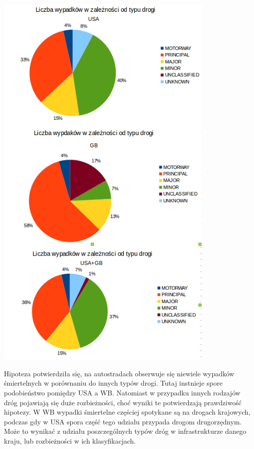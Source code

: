 \centerline{\includegraphics[width=0.8\textwidth]{images/statistics/road_type.png}}

Hipoteza potwierdziła się, na autostradach obserwuje się niewiele
wypadków śmiertelnych w porównaniu do innych typów drogi. Tutaj
instnieje spore podobieństwo pomiędzy USA a WB. Natomiast w przypadku
innych rodzajów dróg pojawiają się duże rozbieżności, choć wyniki te
potwierdzają prawdziwość hipotezy. W WB wypadki śmiertelne częściej
spotykane są na drogach krajowych, podczas gdy w USA spora część tego
udziału przypada drogom drugorzędnym. Może to wynikać z udziału
poszczególnych typów dróg w infrastrukturze danego kraju, lub
rozbieżności w ich klasyfikacjach.
